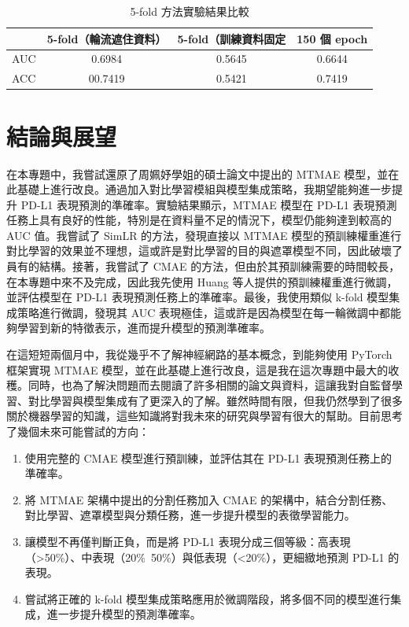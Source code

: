 \documentclass[12pt,a4paper]{article}
\begin{document}
\begin{table}[h]
\centering
\begin{tabular}{lccc}
\toprule
 & \textbf{5-fold（輪流遮住資料）} & \textbf{5-fold（訓練資料固定} & \textbf{150 個 epoch} \\
\midrule
AUC          & 0.6984 & 0.5645 & 0.6644\\
ACC         & 00.7419 & 0.5421 & 0.7419\\
\bottomrule
\end{tabular}
\caption{5-fold 方法實驗結果比較}
\label{tab:5-fold-results}
\end{table}

\newpage

\section{結論與展望}
在本專題中，我嘗試還原了周姵妤學姐的碩士論文中提出的 MTMAE 模型，並在此基礎上進行改良。通過加入對比學習模組與模型集成策略，我期望能夠進一步提升 PD-L1 表現預測的準確率。實驗結果顯示，MTMAE 模型在 PD-L1 表現預測任務上具有良好的性能，特別是在資料量不足的情況下，模型仍能夠達到較高的 AUC 值。我嘗試了 SimLR 的方法，發現直接以 MTMAE 模型的預訓練權重進行對比學習的效果並不理想，這或許是對比學習的目的與遮罩模型不同，因此破壞了員有的結構。接著，我嘗試了 CMAE 的方法，但由於其預訓練需要的時間較長，在本專題中來不及完成，因此我先使用 Huang 等人提供的預訓練權重進行微調，並評估模型在 PD-L1 表現預測任務上的準確率。最後，我使用類似 k-fold 模型集成策略進行微調，發現其 AUC 表現極佳，這或許是因為模型在每一輪微調中都能夠學習到新的特徵表示，進而提升模型的預測準確率。

在這短短兩個月中，我從幾乎不了解神經網路的基本概念，到能夠使用 PyTorch 框架實現 MTMAE 模型，並在此基礎上進行改良，這是我在這次專題中最大的收穫。同時，也為了解決問題而去閱讀了許多相關的論文與資料，這讓我對自監督學習、對比學習與模型集成有了更深入的了解。雖然時間有限，但我仍然學到了很多關於機器學習的知識，這些知識將對我未來的研究與學習有很大的幫助。目前思考了幾個未來可能嘗試的方向：

\begin{enumerate}
  \item 使用完整的 CMAE 模型進行預訓練，並評估其在 PD-L1 表現預測任務上的準確率。
  \item 將 MTMAE 架構中提出的分割任務加入 CMAE 的架構中，結合分割任務、對比學習、遮罩模型與分類任務，進一步提升模型的表徵學習能力。
  \item 讓模型不再僅判斷正負，而是將 PD-L1 表現分成三個等級：高表現（>50\%）、中表現（20\%~50\%）與低表現（<20\%），更細緻地預測 PD-L1 的表現。
  \item 嘗試將正確的 k-fold 模型集成策略應用於微調階段，將多個不同的模型進行集成，進一步提升模型的預測準確率。
\end{enumerate}
\end{document}
